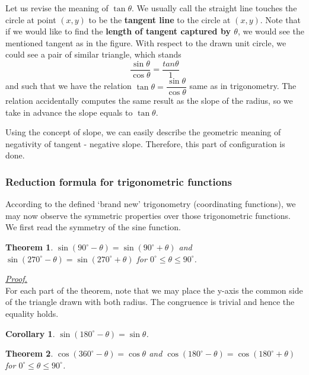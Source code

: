\documentclass[12pt]{article}
\newtheorem*{theorem}{Theorem}
\newtheorem*{corollary}{Corollary}
\renewenvironment{proof}[1][Proof]{\begin{snugshade*} \underline{\textit{{#1}.}}\\}{\hfill \qedsymbol \end{snugshade*}}
\begin{document}
    Let us revise the meaning of $\tan{\theta}$. We usually call the straight line touches the circle at point $(x,y)$ to be the \textbf{tangent line} to the circle at $(x,y)$. Note that if we would like to find the \textbf{length of tangent captured by $\theta$}, we would see the mentioned tangent as in the figure. With respect to the drawn unit circle, we could see a pair of similar triangle, which stands $$\frac{\sin{\theta}}{\cos{\theta}}=\frac{tan{\theta}}{1}$$ and such that we have the relation $\tan{\theta}=\dfrac{\sin{\theta}}{\cos{\theta}}$ same as in trigonometry. The relation accidentally computes the same result as the slope of the radius, so we take in advance the slope equals to $\tan{\theta}$.

    Using the concept of slope, we can easily describe the geometric meaning of negativity of tangent - negative slope. Therefore, this part of configuration is done.

    \subsubsection*{Reduction formula for trigonometric functions}

    According to the defined `brand new' trigonometry (coordinating functions), we may now observe the symmetric properties over those trigonometric functions. We first read the symmetry of the sine function.

    \begin{theorem}
        $\sin{(90^\circ - \theta)}=\sin{(90^\circ + \theta)}$ and $\sin{(270^\circ - \theta)}=\sin{(270^\circ + \theta)}$ for $0^\circ \leq \theta \leq 90^\circ$.
    \end{theorem}

    \begin{proof}
        For each part of the theorem, note that we may place the y-axis the common side of the triangle drawn with both radius. The congruence is trivial and hence the equality holds.
    \end{proof}

    \begin{corollary}
        $\sin{(180^\circ - \theta)}=\sin{\theta}$.
    \end{corollary}

    \begin{theorem}
        $\cos{(360^\circ - \theta)}=\cos{\theta}$ and $\cos{(180^\circ - \theta)}=\cos{(180^\circ + \theta)}$ for $0^\circ \leq \theta \leq 90^\circ$.
    \end{theorem}
\end{document}
